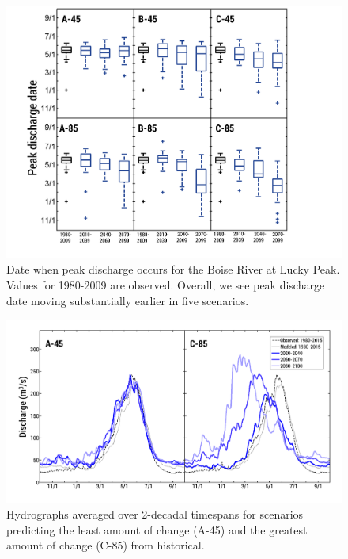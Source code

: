 \documentclass[water,article,submit,moreauthors,pdftex,10pt,a4paper]{mdpi}
\theoremstyle{mdpi}
\newcounter{ex}
\newcounter{re}
\theoremstyle{mdpidefinition}
\begin{document}
\begin{figure}
\centering
\includegraphics[width=\textwidth]{figure-files/figure9.png}
\caption{Date when peak discharge occurs for the Boise River at Lucky Peak. Values for 1980-2009 are observed. Overall, we see peak discharge date moving substantially earlier in five scenarios.}
\label{fig:PeakDischargeDate}
\end{figure}
\clearpage

\begin{figure}
\centering
\includegraphics[width=\textwidth]{figure-files/figure10.png}
\caption{Hydrographs averaged over 2-decadal timespans for scenarios predicting the least amount of change (A-45) and the greatest amount of change (C-85) from historical.}
\label{fig:HydrographDecadeAvg}
\end{figure}
\clearpage
\end{document}
